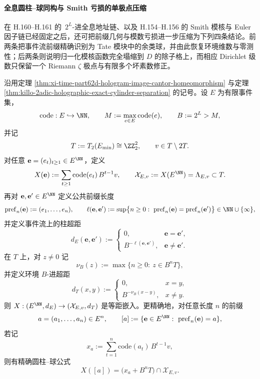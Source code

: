 \paragraph{全息圆柱--球同构与 Smith 亏损的单极点压缩}
在 H.160--H.161 的 \(\,2^L\)-进全息地址链、以及 H.154--H.156 的 Smith 模核与 Euler 因子链已经固定之后，还可把前缀几何与模数亏损进一步压缩为下列四条结论。前两条把事件流前缀精确识别为 Tate 模块中的余类球，并由此恢复环境维数与零测性；后两条则说明归一化模核函数完全塌缩到 \(D\) 的除子格上，而相应 Dirichlet 级数只保留一个 Riemann \(\zeta\) 极点与有限多个坏素数修正。

\begin{conclusion}\label{con:xi-time-part62dgb-hologram-cylinder-ball-isometry}
沿用定理 \ref{thm:xi-time-part62d-hologram-image-cantor-homeomorphism} 与定理 \ref{thm:killo-2adic-holographic-exact-cylinder-separation} 的记号。设 \(E\) 为有限事件集，
\[
\mathrm{code}:E\hookrightarrow \NN,\qquad
M:=\max_{e\in E}\mathrm{code}(e),\qquad
B:=2^L>M,
\]
并记
\[
T:=T_2(E_{\min})\cong \ZZ_2^2,\qquad
v\in T\setminus 2T.
\]
对任意 \(\mathbf e=(e_t)_{t\ge 1}\in E^{\NN}\)，定义
\[
X(\mathbf e):=\sum_{t\ge 1}\mathrm{code}(e_t)\,B^{t-1}v,
\qquad
\mathcal X_{E,v}:=X(E^{\NN})=\Lambda_{E,v}\subset T.
\]
再对 \(\mathbf e,\mathbf e'\in E^{\NN}\) 定义公共前缀长度
\[
\mathrm{pref}_n(\mathbf e):=(e_1,\dots,e_n),
\qquad
\ell(\mathbf e,\mathbf e')
:=
\sup\bigl\{n\ge 0:\ \mathrm{pref}_n(\mathbf e)=\mathrm{pref}_n(\mathbf e')\bigr\}
\in \NN\cup\{\infty\},
\]
并定义事件流上的柱超距
\[
d_E(\mathbf e,\mathbf e')
:=
\begin{cases}
0,& \mathbf e=\mathbf e',\\[2pt]
B^{-\ell(\mathbf e,\mathbf e')},& \mathbf e\neq \mathbf e'.
\end{cases}
\]
在 \(T\) 上，对 \(z\neq 0\) 记
\[
\nu_B(z):=\max\{n\ge 0:\ z\in B^nT\},
\]
并定义环境 \(B\)-进超距
\[
d_T(x,y)
:=
\begin{cases}
0,& x=y,\\[2pt]
B^{-\nu_B(x-y)},& x\neq y.
\end{cases}
\]
则 \(X:(E^{\NN},d_E)\to (\mathcal X_{E,v},d_T)\) 是等距嵌入。更精确地，对任意长度 \(n\) 的前缀
\[
a=(a_1,\dots,a_n)\in E^n,
\qquad
[a]:=\{\mathbf e\in E^{\NN}:\ \mathrm{pref}_n(\mathbf e)=a\},
\]
若记
\[
x_a:=\sum_{t=1}^{n}\mathrm{code}(a_t)\,B^{t-1}v,
\]
则有精确圆柱--球公式
\[
X([a])=\bigl(x_a+B^nT\bigr)\cap \mathcal X_{E,v}.
\]
\end{conclusion}

